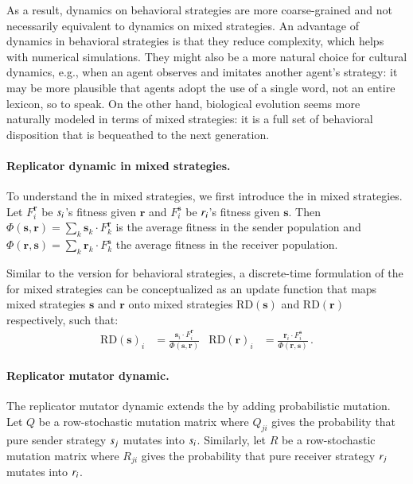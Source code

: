 \documentclass[fleqn,reqno,10pt]{article}
\renewcommand{\Smixed}{\ensuremath{\mathrm{\mathbf{s}}}}
\renewcommand{\Rmixed}{\ensuremath{\mathrm{\mathbf{r}}}}
\newcommand{\rd}{\acro{rd}} %
\newcommand{\rmd}{\acro{rmd}} %
\newcommand{\RD}{\ensuremath{\mathrm{RD}}} %
\begin{document}
As a result, dynamics on behavioral strategies are more coarse-grained
and not necessarily equivalent to dynamics on mixed strategies. An
advantage of dynamics in behavioral strategies is that they reduce
complexity, which helps with numerical simulations. They might also be
a more natural choice for cultural dynamics, e.g., when an agent
observes and imitates another agent's strategy: it may be more
plausible that agents adopt the use of a single word, not an entire
lexicon, so to speak. On the other hand, biological evolution seems
more naturally modeled in terms of mixed strategies: it is a full set
of behavioral disposition that is bequeathed to the next generation.

\paragraph{Replicator dynamic in mixed strategies.} To understand the
\rmd in mixed strategies, we first introduce the \rd in mixed
strategies. Let $F_i^{\Rmixed}$ be $s_i$'s fitness given
$\Rmixed$ and $F_i^{\Smixed}$ be $r_i$'s fitness given
$\Smixed$. Then $\Phi(\Smixed,\Rmixed) = \sum_{k} \Smixed_k \cdot
F_k^{\Rmixed}$ is the average fitness in the sender population and
$\Phi(\Rmixed,\Smixed) = \sum_{k} \Rmixed_k \cdot F_k^{\Smixed}$ the
average fitness in the receiver population.

Similar to the version for behavioral strategies, a discrete-time
formulation of the \rd for mixed strategies can be conceptualized as an
update function that maps mixed strategies $\Smixed$ and $\Rmixed$
onto mixed strategies $\RD(\Smixed)$ and $\RD(\Rmixed)$ respectively,
such that:
\begin{align*}
  \RD(\Smixed)_i & = \frac{\Smixed_i \cdot F_i^{\Rmixed}}{
    \Phi(\Smixed,\Rmixed)} & \RD(\Rmixed)_i & = \frac{\Rmixed_i \cdot
    F_i^{\Smixed}}{ \Phi(\Rmixed,\Smixed)} \,.
\end{align*}


\paragraph{Replicator mutator dynamic.} The replicator mutator dynamic
extends the \rd by adding probabilistic mutation. Let $Q$ be a
row-stochastic mutation matrix where $Q_{ji}$ gives the probability
that pure sender strategy $s_j$ mutates into
$s_i$. Similarly, let $R$ be a row-stochastic mutation matrix
where $R_{ji}$ gives the probability that pure receiver strategy
$r_j$ mutates into $r_i$.
\end{document}
